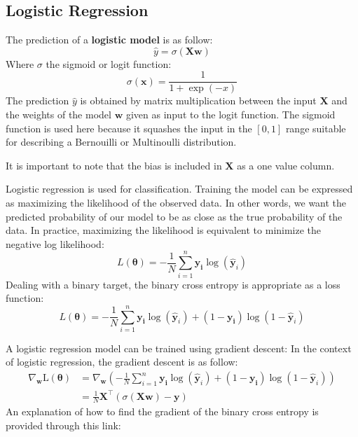 \documentclass[12pt]{report}
\begin{document}
            \subsection{Logistic Regression}
                The prediction of a \textbf{logistic model} is as follow:
                \begin{equation}
                    \hat{y} = \sigma(\boldsymbol{X}\boldsymbol{w})
                \end{equation}
                Where $\sigma$ the sigmoid or logit function:
                \begin{equation}
                \sigma(\boldsymbol{x}) = \frac{1}{1 + \exp(-x)}
                \end{equation}
                The prediction $\hat{y}$ is obtained by matrix multiplication between the input $\boldsymbol{X}$ and the weights of the model $\boldsymbol{w}$ given as input to the logit function.
                The sigmoid function is used here because it squashes the input in the $[0, 1]$ range suitable for describing a Bernouilli or Multinoulli distribution.
                
                It is important to note that the bias is included in $\boldsymbol{X}$ as a one value column.
                
                Logistic regression is used for classification. Training the model can be expressed as maximizing the likelihood of the observed data.
                In other words, we want the predicted probability of our model to be as close as the true probability of the data.
                In practice, maximizing the likelihood is equivalent to minimize the negative log likelihood:
                \begin{equation}
                    L(\boldsymbol{\theta}) = - \frac{1}{N}\sum_{i=1}^{n}\boldsymbol{y_i}\log(\hat{\boldsymbol{y}}_i)
                \end{equation}
                Dealing with a binary target, the binary cross entropy is appropriate as a loss function:
                \begin{equation}
                    L(\boldsymbol{\theta}) = - \frac{1}{N}\sum_{i=1}^{n}\boldsymbol{y_i}\log(\hat{\boldsymbol{y}}_i) + (1 - \boldsymbol{y_i})\log(1 - \hat{\boldsymbol{y}}_i)
                \end{equation}
                
                A logistic regression model can be trained using gradient descent:
                In the context of logistic regression, the gradient descent is as follow:
                \begin{align}
                    \nabla_{\boldsymbol{w}}\text{L}(\boldsymbol{\theta}) &=  \nabla_{\boldsymbol{w}}\left(-\frac{1}{N}\sum_{i=1}^{n}\boldsymbol{y_i}\log(\hat{\boldsymbol{y}}_i) + (1 - \boldsymbol{y_i})\log(1 - \hat{\boldsymbol{y}}_i)\right)\\
                    &= \frac{1}{N}\boldsymbol{X}^\top(\sigma(\boldsymbol{X}\boldsymbol{w}) - \boldsymbol{y})
                \end{align}
                An explanation of how to find the gradient of the binary cross entropy is provided through this link:
                
\end{document}
